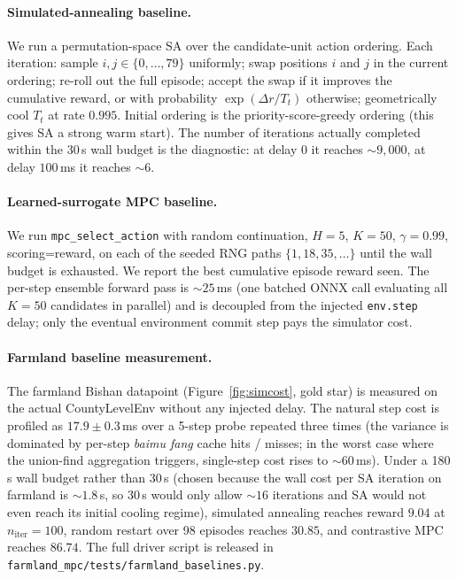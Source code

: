 \documentclass[11pt]{article}
\begin{document}
\paragraph{Simulated-annealing baseline.} We run a permutation-space SA over the candidate-unit action ordering. Each iteration: sample $i, j \in \{0, \ldots, 79\}$ uniformly; swap positions $i$ and $j$ in the current ordering; re-roll out the full episode; accept the swap if it improves the cumulative reward, or with probability $\exp(\Delta r / T_t)$ otherwise; geometrically cool $T_t$ at rate $0.995$. Initial ordering is the priority-score-greedy ordering (this gives SA a strong warm start). The number of iterations actually completed within the 30\,s wall budget is the diagnostic: at delay 0 it reaches $\sim 9{,}000$, at delay $100$\,ms it reaches $\sim 6$.

\paragraph{Learned-surrogate MPC baseline.} We run \texttt{mpc\_select\_action} with random continuation, $H{=}5$, $K{=}50$, $\gamma{=}0.99$, scoring=reward, on each of the seeded RNG paths $\{1, 18, 35, \ldots\}$ until the wall budget is exhausted. We report the best cumulative episode reward seen. The per-step ensemble forward pass is $\sim 25$\,ms (one batched ONNX call evaluating all $K{=}50$ candidates in parallel) and is decoupled from the injected \texttt{env.step} delay; only the eventual environment commit step pays the simulator cost.

\paragraph{Farmland baseline measurement.} The farmland Bishan datapoint (Figure~\ref{fig:simcost}, gold star) is measured on the actual CountyLevelEnv without any injected delay. The natural step cost is profiled as $17.9 \pm 0.3$\,ms over a 5-step probe repeated three times (the variance is dominated by per-step \textit{baimu fang} cache hits / misses; in the worst case where the union-find aggregation triggers, single-step cost rises to $\sim 60$\,ms). Under a 180\,s wall budget rather than 30\,s (chosen because the wall cost per SA iteration on farmland is $\sim 1.8$\,s, so 30\,s would only allow $\sim 16$ iterations and SA would not even reach its initial cooling regime), simulated annealing reaches reward $9.04$ at $n_{\text{iter}}=100$, random restart over 98 episodes reaches $30.85$, and contrastive MPC reaches $86.74$. The full driver script is released in \texttt{farmland\_mpc/tests/farmland\_baselines.py}.
\end{document}
